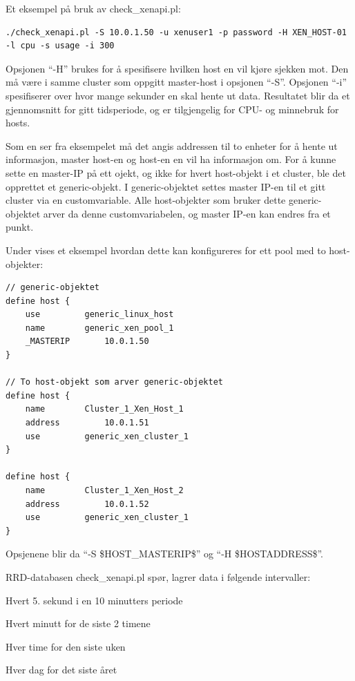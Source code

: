 Et eksempel på bruk av check\_xenapi.pl: 
\begin{lstlisting}[style=example]
./check_xenapi.pl -S 10.0.1.50 -u xenuser1 -p password -H XEN_HOST-01 -l cpu -s usage -i 300
\end{lstlisting}

Opsjonen ``-H'' brukes for å spesifisere hvilken host en vil kjøre sjekken mot. Den må være i samme cluster som oppgitt master-host i opsjonen ``-S''. Opsjonen ``-i'' spesifiserer over hvor mange sekunder en skal hente ut data. Resultatet blir da et gjennomsnitt for gitt tidsperiode, og er tilgjengelig for CPU- og minnebruk for hosts.

Som en ser fra eksempelet må det angis addressen til to enheter for å hente ut informasjon, master host-en og host-en en vil ha informasjon om. For å kunne sette en master-IP på ett ojekt, og ikke for hvert host-objekt i et cluster, ble det opprettet et generic-objekt. I generic-objektet settes master IP-en til et gitt cluster via en customvariable. Alle host-objekter som bruker dette generic-objektet arver da denne customvariabelen, og master IP-en kan endres fra et punkt.

Under vises et eksempel hvordan dette kan konfigureres for ett pool med to host-objekter:
\begin{lstlisting}[style=example]
// generic-objektet 
define host {
    use 		generic_linux_host
    name 		generic_xen_pool_1
    _MASTERIP 		10.0.1.50
}

// To host-objekt som arver generic-objektet
define host {
    name 		Cluster_1_Xen_Host_1
    address 		10.0.1.51
    use 		generic_xen_cluster_1
}

define host {
    name 		Cluster_1_Xen_Host_2
    address 		10.0.1.52
    use 		generic_xen_cluster_1
}
\end{lstlisting}

Opsjenene blir da ``-S \$HOST\_MASTERIP\$'' og ``-H \$HOSTADDRESS\$''.

RRD-databasen check\_xenapi.pl spør, lagrer data i følgende intervaller:
\begin{enumerate*}
        \item Hvert 5. sekund i en 10 minutters periode
        \item Hvert minutt for de siste 2 timene
	\item Hver time for den siste uken
        \item Hver dag for det siste året
\end{enumerate*}

